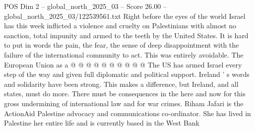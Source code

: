 \begin{textsample}{POS Dim 2 – global\_north\_2025\_03 – Score 26.00 – global\_north\_2025\_03/122539561.txt}
Right before the eyes of the world Israel has this week inflicted a violence and cruelty on Palestinians with almost no sanction, total impunity and armed to the teeth by the United States.
It is hard to put in words the pain, the fear, the sense of deep disappointment with the failure of the international community to act.
This was entirely avoidable.
The European Union as a @ @ @ @ @ @ @ @ @ @ The US has armed Israel every step of the way and given full diplomatic and political support.
Ireland ' s words and solidarity have been strong.
This makes a difference, but Ireland, and all states, must do more.
There must be consequences in the here and now for this gross undermining of international law and for war crimes.
Riham Jafari is the ActionAid Palestine advocacy and communications co-ordinator.
She has lived in Palestine her entire life and is currently based in the West Bank

\end{textsample}
